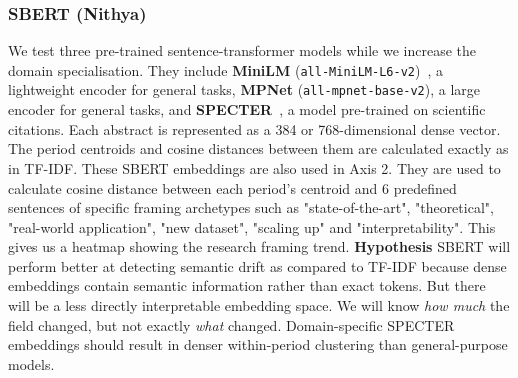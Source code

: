 \documentclass[11pt]{article}
\begin{document}
\subsubsection{SBERT (Nithya)}
We test three pre-trained sentence-transformer models while we increase the domain specialisation. They include \textbf{MiniLM} (\texttt{all-MiniLM-L6-v2})~\cite{reimers-gurevych-2019-sentence}, a lightweight encoder for general tasks, \textbf{MPNet} (\texttt{all-mpnet-base-v2}), a large encoder for general tasks, and \textbf{SPECTER}~\cite{specter2020cohan}, a model pre-trained on scientific citations. Each abstract is represented as a 384 or 768-dimensional dense vector. The period centroids and cosine distances between them are calculated exactly as in TF-IDF. These SBERT embeddings are also used in Axis 2. They are used to calculate cosine distance between each period's centroid and 6 predefined sentences of specific framing archetypes such as "state-of-the-art", "theoretical", "real-world application", "new dataset", "scaling up" and "interpretability". This gives us a heatmap showing the research framing trend.
\textbf{Hypothesis} SBERT will perform better at detecting semantic drift as compared to TF-IDF because dense embeddings contain semantic information rather than exact tokens. But there will be a less directly interpretable embedding space. We will know \emph{how much} the field changed, but not exactly \emph{what} changed. Domain-specific SPECTER embeddings should result in denser within-period clustering than general-purpose models.
\end{document}
